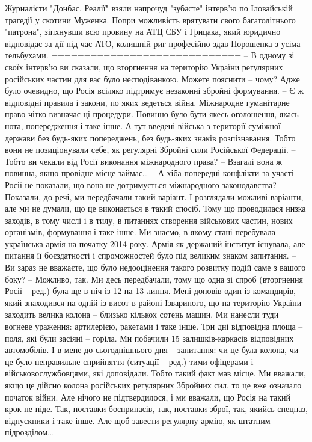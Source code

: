 Журналісти "Донбас. Реалії" взяли напрочуд "зубасте" інтерв'ю по Іловайській трагедії у скотини Муженка. Попри можливість врятувати свого багатолітнього "патрона", зіпхнувши всю провину на АТЦ СБУ і Грицака, який юридично відповідає за дії під час АТО, колишній риг професійно здав Порошенка з усіма тельбухами.
 =============================
– В одному зі своїх інтерв’ю ви сказали, що вторгнення на територію України регулярних російських частин для вас було несподіванкою. Можете пояснити – чому? Адже було очевидно, що Росія всіляко підтримує незаконні збройні формування.
– Є ж відповідні правила і закони, по яких ведеться війна. Міжнародне гуманітарне право чітко визначає ці процедури. Повинно було бути якесь оголошення, якась нота, попередження і таке інше. А тут введені війська з території суміжної держави без будь-яких попереджень, без будь-яких знаків розпізнавання. Тобто вони не позиціонували себе, як регулярні Збройні сили Російської Федерації.
– Тобто ви чекали від Росії виконання міжнародного права?
– Взагалі вона ж повинна, якщо провідне місце займає…
– А хіба попередні конфлікти за участі Росії не показали, що вона не дотримується міжнародного законодавства?
– Показали, до речі, ми передбачали такий варіант. І розглядали можливі варіанти, але ми не думали, що це виконається в такий спосіб. Тому що проводилася низка заходів, в тому числі і в тилу, в питаннях створення військових частин, нових організмів, формування і таке інше. Ми знаємо, в якому стані перебувала українська армія на початку 2014 року. Армія як держаний інститут існувала, але питання її боєздатності і спроможностей було під великим знаком запитання.
– Ви зараз не вважаєте, що було недооцінення такого розвитку подій саме з вашого боку?
– Можливо, так. Ми десь передбачали, тому що одна зі спроб (вторгнення Росії – ред.) була ще в ніч із 12 на 13 липня. Мені доповів один із командирів, який знаходився на одній із висот в районі Ізвариного, що на територію України заходить велика колона – близько кількох сотень машин. Ми нанесли туди вогневе ураження: артилерією, ракетами і таке інше. Три дні відповідна площа – поля, які були засіяні – горіла. Ми побачили 15 залишків-каркасів відповідних автомобілів. І в мене до сьогоднішнього дня – запитання: чи це була колона, чи це було неправильне сприйняття (ситуації – ред.) тими офіцерами і військовослужбовцями, які доповідали. Тобто такий факт мав місце. Ми вважали, якщо це дійсно колона російських регулярних Збройних сил, то це вже означало початок війни. Але нічого не підтвердилося, і ми вважали, що Росія на такий крок не піде. Так, поставки боєприпасів, так, поставки зброї, так, якийсь спецназ, відпускники і таке інше. Але щоб завести регулярну армію, як штатним підрозділом…
